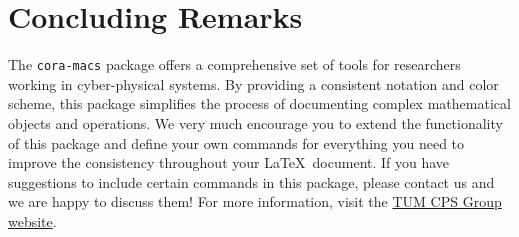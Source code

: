 \documentclass{article}
\begin{document}
\section{Concluding Remarks}
The \texttt{cora-macs} package offers a comprehensive set of tools for researchers working in cyber-physical systems.
By providing a consistent notation and color scheme, this package simplifies the process of documenting complex mathematical objects and operations.
We very much encourage you to extend the functionality of this package and define your own commands for everything you need to improve the consistency throughout your \LaTeX\ document.
If you have suggestions to include certain commands in this package, please contact us and we are happy to discuss them!
For more information, visit the \href{https://www.ce.cit.tum.de/cps}{TUM CPS Group website}.
\end{document}
